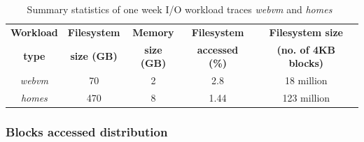  \begin{table}[t]
 \caption{Summary statistics of one week I/O workload traces \textit{webvm} and \textit{homes}~\cite{iodedup}}
 \begin{center}
 \begin{tabular}{|c|c|c|c|c|} \hline
   \bf{Workload} & \bf{Filesystem} & \bf{Memory} & \bf{Filesystem} & \bf{Filesystem size} \\
  \bf{type} & \bf{size (GB)} & \bf{size (GB)} & \bf{accessed (\%)} & \bf{(no. of 4KB blocks)} \\ \hline
  \textit{webvm} & 70 & 2 & 2.8 & 18 million \\
  \textit{homes} & 470 & 8 & 1.44 & 123 million \\ \hline
 \end{tabular}
 \label{tab:tracechar-summary-stats}
 \end{center}
 \end{table}

\subsubsection{Blocks accessed distribution}

